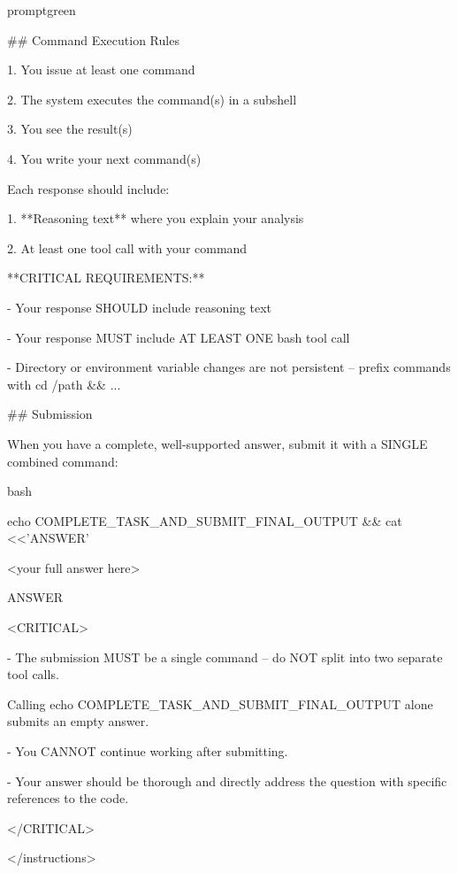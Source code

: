 \begin{promptbox}{promptgreen}
{\#\# Command Execution Rules\par
\vspace{0.35em}\par
1. You issue at least one command\par
2. The system executes the command(s) in a subshell\par
3. You see the result(s)\par
4. You write your next command(s)\par
\vspace{0.35em}\par
Each response should include:\par
1. **Reasoning text** where you explain your analysis\par
2. At least one tool call with your command\par
\vspace{0.35em}\par
**CRITICAL REQUIREMENTS:**\par
- Your response SHOULD include reasoning text\par
- Your response MUST include AT LEAST ONE bash tool call\par
- Directory or environment variable changes are not persistent -- prefix commands with \textasciigrave{}cd /path \&\& ...\textasciigrave{}\par
\vspace{0.35em}\par
\#\# Submission\par
\vspace{0.35em}\par
When you have a complete, well-supported answer, submit it with a SINGLE combined command:\par
\textasciigrave{}\textasciigrave{}\textasciigrave{}bash\par
echo COMPLETE\_TASK\_AND\_SUBMIT\_FINAL\_OUTPUT \&\& cat \textless{}\textless{}'ANSWER'\par
\textless{}your full answer here\textgreater{}\par
ANSWER\par
\textasciigrave{}\textasciigrave{}\textasciigrave{}\par
\vspace{0.35em}\par
\textless{}CRITICAL\textgreater{}\par
- The submission MUST be a single command -- do NOT split into two separate tool calls.\par
\hspace*{0.90em}Calling \textasciigrave{}echo COMPLETE\_TASK\_AND\_SUBMIT\_FINAL\_OUTPUT\textasciigrave{} alone submits an empty answer.\par
- You CANNOT continue working after submitting.\par
- Your answer should be thorough and directly address the question with specific references to the code.\par
\textless{}/CRITICAL\textgreater{}\par
\textless{}/instructions\textgreater{}\par
}
\end{promptbox}



